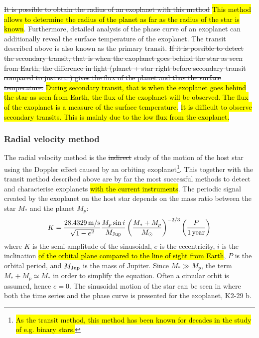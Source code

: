 \st{It is possible to obtain the radius of an exoplanet with this method} \hl{This method allows to
determine the radius of the planet as far as the radius of the star is known}. Furthermore, detailed
analysis of the phase curve of an exoplanet can additionally reveal the surface temperature of the
exoplanet. The transit described above is also known as the primary transit. \st{If it is possible
to detect the secondary transit, that is when the exoplanet goes behind the star as seen from Earth,
the difference in light (planet + star right before secondary transit compared to just star) gives
the flux of the planet and thus the surface temperature.} \hl{During secondary transit, that is when
the exoplanet goes behind the star as seen from Earth, the flux of the exoplanet will be observed.
The flux of the exoplanet is a measure of the surface temperature.} \hl{It is difficult to observe
secondary transits. This is mainly due to the low flux from the exoplanet.}



\subsubsection{Radial velocity method}
\label{sec:rvmethod}

The radial velocity method is the \st{indirect} study of the motion of the host star using the
Doppler effect caused by an orbiting exoplanet\footnote{\hl{As the transit method, this method has
been known for decades in the study of e.g. binary stars.}}. This together with the transit method
described above are by far the most successful methods to detect and characterise exoplanets \hl{
with the current instruments}. The periodic signal created by the exoplanet on the host star depends
on the mass ratio between the star $M_\ast$ and the planet $M_p$:
\begin{align}
  K = \frac{\SI{28.4329}{m/s}}{\sqrt{1-e^2}} \frac{M_p\sin i}{M_\mathrm{Jup}} \left( \frac{M_\ast+M_p}{M_\odot} \right)^{-2/3} \left(\frac{P}{\SI{1}{year}}\right)  \label{eq:rv}
\end{align}
where $K$ is the semi-amplitude of the sinusoidal, $e$ is the eccentricity, $i$ is the inclination
\hl{of the orbital plane compared to the line of sight from Earth}, $P$ is the orbital period, and
$M_\mathrm{Jup}$ is the mass of Jupiter. Since $M_\ast \gg M_p$, the term $M_\ast+M_p\simeq M_\ast$ in order
to simplify the equation. Often a circular orbit is assumed, hence $e=0$. The sinusoidal motion of
the star can be seen in  where both the time series and the phase curve is
presented for the exoplanet, K2-29 b.

